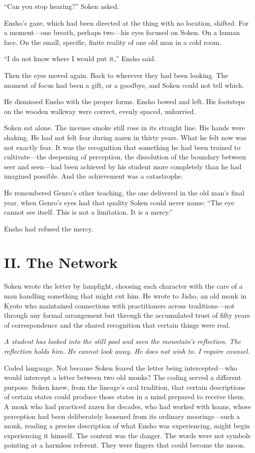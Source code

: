 ``Can you stop hearing?'' Soken asked.

Ensho's gaze, which had been directed at the thing with no location, shifted. For a moment---one breath, perhaps two---his eyes focused on Soken. On a human face. On the small, specific, finite reality of one old man in a cold room.

``I do not know where I would put it,'' Ensho said.

Then the eyes moved again. Back to wherever they had been looking. The moment of focus had been a gift, or a goodbye, and Soken could not tell which.

He dismissed Ensho with the proper forms. Ensho bowed and left. His footsteps on the wooden walkway were correct, evenly spaced, unhurried.

Soken sat alone. The incense smoke still rose in its straight line. His hands were shaking. He had not felt fear during zazen in thirty years. What he felt now was not exactly fear. It was the recognition that something he had been trained to cultivate---the deepening of perception, the dissolution of the boundary between seer and seen---had been achieved by his student more completely than he had imagined possible. And the achievement was a catastrophe.

He remembered Genro's other teaching, the one delivered in the old man's final year, when Genro's eyes had that quality Soken could never name: ``The eye cannot see itself. This is not a limitation. It is a mercy.''

Ensho had refused the mercy.


\section*{II. The Network}

Soken wrote the letter by lamplight, choosing each character with the care of a man handling something that might cut him. He wrote to Jisho, an old monk in Kyoto who maintained connections with practitioners across traditions---not through any formal arrangement but through the accumulated trust of fifty years of correspondence and the shared recognition that certain things were real.

\emph{A student has looked into the still pool and seen the mountain's reflection. The reflection holds him. He cannot look away. He does not wish to. I require counsel.}

Coded language. Not because Soken feared the letter being intercepted---who would intercept a letter between two old monks? The coding served a different purpose. Soken knew, from the lineage's oral tradition, that certain descriptions of certain states could produce those states in a mind prepared to receive them. A monk who had practiced zazen for decades, who had worked with koans, whose perception had been deliberately loosened from its ordinary moorings---such a monk, reading a precise description of what Ensho was experiencing, might begin experiencing it himself. The content was the danger. The words were not symbols pointing at a harmless referent. They were fingers that could become the moon.

